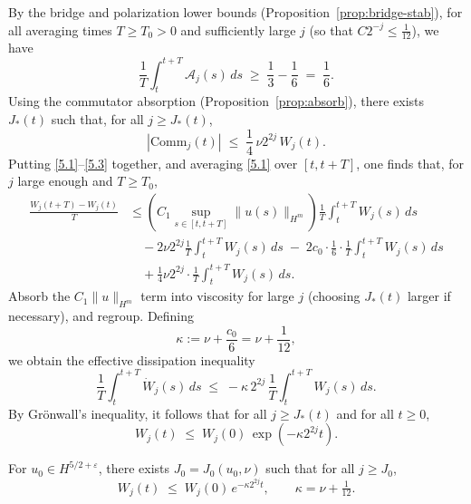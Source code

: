 \documentclass[11pt]{article}
\begin{document}
By the bridge and polarization lower bounds (Proposition~\ref{prop:bridge-stab}), for all averaging times $T \geq T_0>0$ and sufficiently large $j$ (so that $C 2^{-j} \le \frac{1}{12}$), we have
\begin{equation}
\frac{1}{T} \int_t^{t+T} \mathcal{A}_j(s) \, ds \;\geq\; \frac{1}{3} - \frac{1}{6} \;=\; \frac{1}{6}. \tag{5.2}
\end{equation}
Using the commutator absorption (Proposition~\ref{prop:absorb}), there exists $J_*(t)$ such that, for all $j \geq J_*(t)$,
\begin{equation}
|\mathrm{Comm}_j(t)| \;\leq\; \frac{1}{4} \, \nu 2^{2j} \, W_j(t). \tag{5.3}
\end{equation}
Putting \eqref{5.1}--\eqref{5.3} together, and averaging \eqref{5.1} over $[t, t+T]$, one finds that, for $j$ large enough and $T \geq T_0$,
\begin{align}
\frac{W_j(t+T) - W_j(t)}{T} 
&\leq \left( C_1 \sup_{s \in [t,t+T]} \|u(s)\|_{H^m} \right) \frac{1}{T} \int_t^{t+T} W_j(s)\, ds \nonumber \\
&\quad - 2 \nu 2^{2j} \frac{1}{T} \int_t^{t+T} W_j(s)\, ds \; - \; 2 c_0 \cdot \frac{1}{6} \cdot \frac{1}{T} \int_t^{t+T} W_j(s)\, ds \nonumber \\
&\quad + \frac{1}{4} \nu 2^{2j} \cdot \frac{1}{T} \int_t^{t+T} W_j(s)\, ds. \tag{5.4}
\end{align}
Absorb the $C_1\|u\|_{H^m}$ term into viscosity for large $j$ (choosing $J_*(t)$ larger if necessary), and regroup. Defining 
\[
\kappa := \nu + \frac{c_0}{6} = \nu + \frac{1}{12},
\]
we obtain the effective dissipation inequality
\begin{equation}
\frac{1}{T} \int_t^{t+T} \dot{W}_j(s) \, ds \;\leq\; - \kappa \, 2^{2j}\, \frac{1}{T} \int_t^{t+T} W_j(s) \, ds. \tag{5.5}
\end{equation}
By Grönwall’s inequality, it follows that for all $j \geq J_*(t)$ and for all $t \ge 0$,
\begin{equation}
W_j(t) \;\leq\; W_j(0) \, \exp\!\left(- \kappa 2^{2j} t\right). \tag{5.6}
\end{equation}

\begin{proposition} \label{prop:exp}
For $u_0 \in H^{5/2+\varepsilon}$, there exists $J_0 = J_0(u_0,\nu)$ such that for all $j \geq J_0$,
\[
W_j(t) \;\leq\; W_j(0) \, e^{-\kappa 2^{2j} t}, \qquad \kappa = \nu + \tfrac{1}{12}.
\]
\end{proposition}
\end{document}
